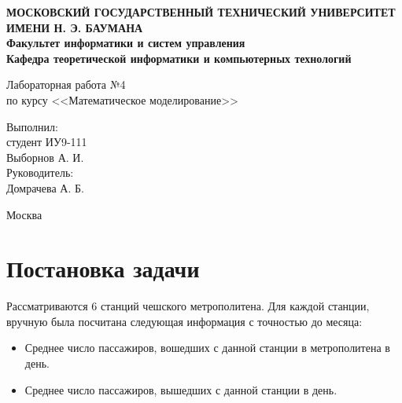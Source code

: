 \documentclass[12pt,a4paper,oneside]{extarticle}
\begin{document}
\pgfplotsset{compat=1.8}

\thispagestyle{empty}
\newpage
{
\centering


\textbf{
МОСКОВСКИЙ ГОСУДАРСТВЕННЫЙ ТЕХНИЧЕСКИЙ УНИВЕРСИТЕТ ИМЕНИ Н. Э. БАУМАНА \\
Факультет информатики и систем управления \\
Кафедра теоретической информатики и компьютерных технологий}
\bigskip
\bigskip
\bigskip
\bigskip
\bigskip
\bigskip
\bigskip

\vfill


Лабораторная работа №4 \\
по курсу <<Математическое моделирование>>

\bigskip

\bigskip

\vfill



\hfill\parbox{4cm} {
Выполнил:\\
студент ИУ9-111 \hfill \\
Выборнов А. И.\hfill \medskip\\
Руководитель:\\
Домрачева А. Б.\hfill
}


\vspace{\fill}

Москва \number\year
\clearpage
}



\clearpage


\section{Постановка задачи}
    Рассматриваются 6 станций чешского метрополитена. Для каждой станции, вручную была посчитана следующая информация с точностью до месяца:
    \begin{itemize}
        \item Среднее число пассажиров, вошедших с данной станции в метрополитена в день.
        \item Среднее число пассажиров, вышедших с данной станции в день.
    \end{itemize}
\end{document}
